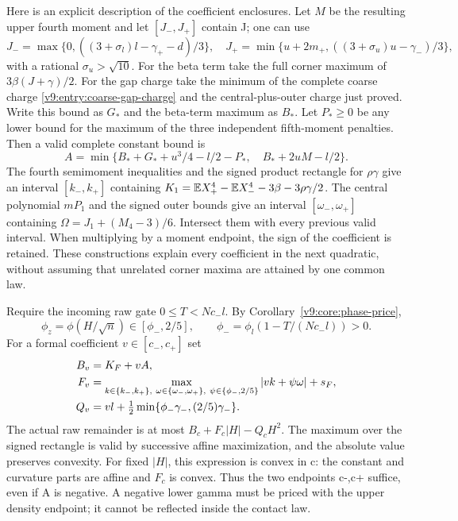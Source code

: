 Here is an explicit description of the coefficient enclosures. Let
$M$ be the resulting upper fourth moment and let $[J_-,J_+]$ contain J;
one can use
\[
 J_- =\max\{0,((3+\sigma_l)l-\gamma_+-d)/3\},\quad
 J_+=\min\{u+2m_+,((3+\sigma_u)u-\gamma_-)/3\},
\]
with a rational $\sigma_u>\sqrt{10}$. For the beta term take the full
corner maximum of $3\beta(J+\gamma)/2$. For the gap charge take the
minimum of the complete coarse charge
\eqref{v9:entry:coarse-gap-charge} and the central-plus-outer charge
just proved. Write this bound as $G_*$ and the beta-term maximum as $B_*$.
Let $P_*\ge0$ be any lower bound for the maximum of the three independent
fifth-moment penalties. Then a valid complete constant bound is
\begin{equation}\label{v9:entry:signed-constant}
 A=\min\{B_*+G_*+u^3/4-l/2-P_*,\quad B_*+2uM-l/2\}.
\end{equation}
The fourth semimoment inequalities and the signed product rectangle
for $\rho\gamma$ give an interval $[k_-,k_+]$ containing
$K_1=\mathbb E X_+^4-\mathbb E X_-^4-3\beta-3\rho\gamma/2$.
The central polynomial $mP_1$ and the signed outer bounds give an
interval $[\omega_-,\omega_+]$ containing
$\Omega=J_1+(M_4-3)/6$. Intersect them with every previous valid interval.
When multiplying by a moment endpoint, the sign of the coefficient is
retained. These constructions explain every coefficient in the next
quadratic, without assuming that unrelated corner maxima are attained
by one common law.

Require the incoming raw gate $0\le T<Nc_-l$. By
Corollary~\ref{v9:core:phase-price},
\[
 \phi_z=\phi(H/\sqrt n)\in[\phi_-,2/5],\qquad
 \phi_- =\phi_l(1-T/(Nc_-l))>0.
\]
For a formal coefficient $v\in[c_-,c_+]$ set
\begin{align}
 B_v&=K_F+vA,\notag\\
 F_v&=\max_{k\in\{k_-,k_+\},\ \omega\in\{\omega_-,\omega_+\},\
                    \psi\in\{\phi_-,2/5\}}|vk+\psi\omega|+s_F,\notag\\
 Q_v&=vl+\tfrac12\min\{\phi_-\gamma_-,(2/5)\gamma_-\}.
 \label{v9:entry:signed-quadratic}
\end{align}
The actual raw remainder is at most $B_c+F_c|H|-Q_cH^2$.
The maximum over the signed rectangle is valid by successive affine
maximization, and the absolute value preserves convexity. For fixed
$|H|$, this expression is convex in c: the constant and curvature
parts are affine and $F_c$ is convex. Thus the two endpoints c-,c+
suffice, even if A is negative. A negative lower gamma must be priced
with the upper density endpoint; it cannot be reflected inside the
contact law.

